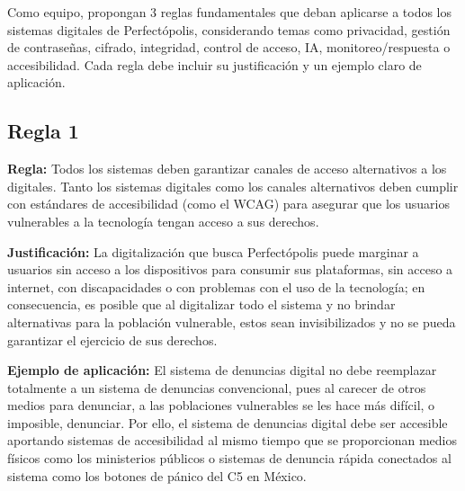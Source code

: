 
Como equipo, propongan 3 reglas fundamentales que deban aplicarse a todos los sistemas digitales de Perfectópolis, considerando temas como privacidad, gestión de contraseñas, cifrado, integridad, control de acceso, IA, monitoreo/respuesta o accesibilidad. Cada regla debe incluir su justificación y un ejemplo claro de aplicación.

\subsection*{Regla 1}
\begin{itemizeColor}
    \item \textbf{Regla:} 
    Todos los sistemas deben garantizar canales de acceso alternativos a los digitales. Tanto los sistemas digitales como los canales alternativos deben cumplir con estándares de accesibilidad (como el WCAG) para asegurar que los usuarios vulnerables a la tecnología tengan acceso a sus derechos.
    \item \textbf{Justificación:} 
	    La digitalización que busca Perfectópolis puede marginar a usuarios sin acceso a los dispositivos para consumir sus plataformas, sin acceso a internet, con discapacidades o con problemas con el uso de la tecnología; en consecuencia, es posible que al digitalizar todo el sistema y no brindar alternativas para la población vulnerable, estos sean invisibilizados y no se pueda garantizar el ejercicio de sus derechos.

    \item \textbf{Ejemplo de aplicación:} 
	    El sistema de denuncias digital no debe reemplazar totalmente a un sistema de denuncias convencional, pues al carecer de otros medios para denunciar, a las poblaciones vulnerables se les hace más difícil, o imposible, denunciar. Por ello, el sistema de denuncias digital debe ser accesible aportando sistemas de accesibilidad al mismo tiempo que se proporcionan medios físicos como los ministerios públicos o sistemas de denuncia rápida conectados al sistema como los botones de pánico del C5 en México.
\end{itemizeColor}

